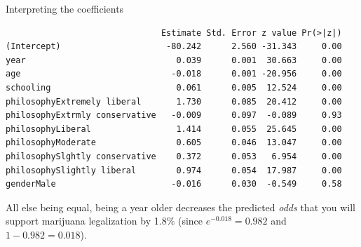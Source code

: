 \documentclass{beamer}\usepackage[]{graphicx}\usepackage[]{color}
\makeatletter
\newcommand{\hlnum}[1]{\textcolor[rgb]{0.824,0.412,0.118}{#1}}%
\newcommand{\hlstr}[1]{\textcolor[rgb]{1,0.894,0.71}{#1}}%
\newcommand{\hlopt}[1]{\textcolor[rgb]{1,0.894,0.769}{#1}}%
\newcommand{\hlstd}[1]{\textcolor[rgb]{1,0.894,0.769}{#1}}%
\newcommand{\hlkwb}[1]{\textcolor[rgb]{0.804,0.776,0.451}{#1}}%
\newcommand{\hlkwc}[1]{\textcolor[rgb]{0.78,0.941,0.545}{#1}}%
\newcommand{\hlkwd}[1]{\textcolor[rgb]{1,0.78,0.769}{#1}}%
\newenvironment{kframe}{%
 \def\at@end@of@kframe{}%
 \ifinner\ifhmode%
  \def\at@end@of@kframe{\end{minipage}}%
  \begin{minipage}{\columnwidth}%
 \fi\fi%
 \def\FrameCommand##1{\hskip\@totalleftmargin \hskip-\fboxsep
 \colorbox{shadecolor}{##1}\hskip-\fboxsep
     \hskip-\linewidth \hskip-\@totalleftmargin \hskip\columnwidth}%
 \MakeFramed {\advance\hsize-\width
   \@totalleftmargin\z@ \linewidth\hsize
   \@setminipage}}%
 {\par\unskip\endMakeFramed%
 \at@end@of@kframe}
\newenvironment{knitrout}{}{} %
\makeatother
\begin{document}
\begin{darkframes}
    \begin{frame}[fragile]{Interpreting the coefficients}
      \fontsize{9}{9}\selectfont
\begin{knitrout}
\begin{kframe}
\begin{verbatim}
                               Estimate Std. Error z value Pr(>|z|)
(Intercept)                     -80.242      2.560 -31.343     0.00
year                              0.039      0.001  30.663     0.00
age                              -0.018      0.001 -20.956     0.00
schooling                         0.061      0.005  12.524     0.00
philosophyExtremely liberal       1.730      0.085  20.412     0.00
philosophyExtrmly conservative   -0.009      0.097  -0.089     0.93
philosophyLiberal                 1.414      0.055  25.645     0.00
philosophyModerate                0.605      0.046  13.047     0.00
philosophySlghtly conservative    0.372      0.053   6.954     0.00
philosophySlightly liberal        0.974      0.054  17.987     0.00
genderMale                       -0.016      0.030  -0.549     0.58
\end{verbatim}
\end{kframe}
\end{knitrout}
      \fontsize{11}{11}\selectfont
      All else being equal, being a year older decreases the predicted \emph{odds} that you will support marijuana legalization by 1.8\% (since $e^{-0.018} = 0.982$ and $1-0.982 = 0.018$).
    \end{frame}



\end{darkframes}
\end{document}
